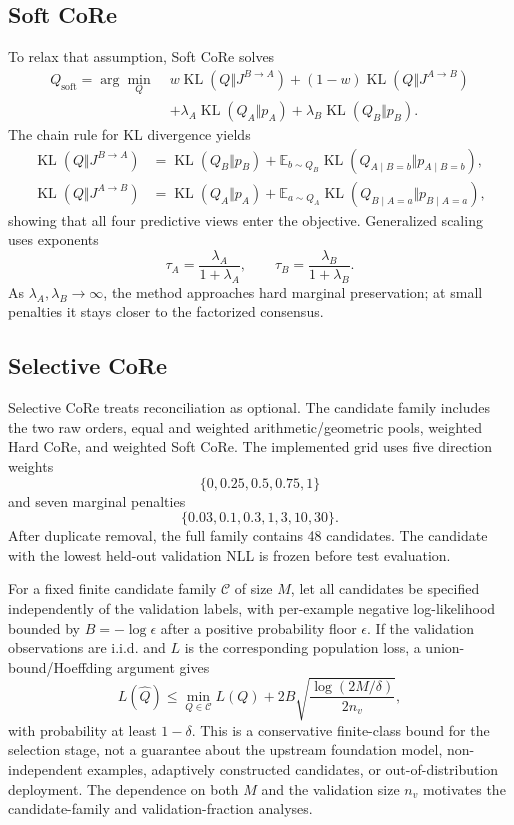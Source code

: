 \documentclass[a4paper,fleqn]{cas-sc}
\newcommand{\KL}{\operatorname{KL}}
\newcommand{\E}{\mathbb{E}}
\newcommand{\Jone}{J^{B\rightarrow A}}
\newcommand{\Jtwo}{J^{A\rightarrow B}}
\newcommand{\Qsoft}{Q_{\mathrm{soft}}}
\newcommand{\Cset}{\mathcal{C}}
\begin{document}
\subsection{Soft CoRe}
To relax that assumption, Soft CoRe solves
\begin{align}
\Qsoft=\arg\min_Q\;&w\KL(Q\Vert\Jone)+(1-w)\KL(Q\Vert\Jtwo)\nonumber\\
&+\lambda_A\KL(Q_A\Vert p_A)+\lambda_B\KL(Q_B\Vert p_B).
\end{align}
The chain rule for KL divergence yields
\begin{align}
\KL(Q\Vert\Jone)&=\KL(Q_B\Vert p_B)+\E_{b\sim Q_B}\KL(Q_{A\mid B=b}\Vert p_{A\mid B=b}),\\
\KL(Q\Vert\Jtwo)&=\KL(Q_A\Vert p_A)+\E_{a\sim Q_A}\KL(Q_{B\mid A=a}\Vert p_{B\mid A=a}),
\end{align}
showing that all four predictive views enter the objective. Generalized scaling uses exponents
\begin{equation}
\tau_A=\frac{\lambda_A}{1+\lambda_A},\qquad
\tau_B=\frac{\lambda_B}{1+\lambda_B}.
\end{equation}
As $\lambda_A,\lambda_B\rightarrow\infty$, the method approaches hard marginal preservation; at small penalties it stays closer to the factorized consensus.

\subsection{Selective CoRe}
Selective CoRe treats reconciliation as optional. The candidate family includes the two raw orders, equal and weighted arithmetic/geometric pools, weighted Hard CoRe, and weighted Soft CoRe. The implemented grid uses five direction weights
\begin{equation}
\{0,0.25,0.5,0.75,1\}
\end{equation}
and seven marginal penalties
\begin{equation}
\{0.03,0.1,0.3,1,3,10,30\}.
\end{equation}
After duplicate removal, the full family contains 48 candidates. The candidate with the lowest held-out validation NLL is frozen before test evaluation.

For a fixed finite candidate family $\Cset$ of size $M$, let all candidates be specified independently of the validation labels, with per-example negative log-likelihood bounded by $B=-\log\epsilon$ after a positive probability floor $\epsilon$. If the validation observations are i.i.d. and $L$ is the corresponding population loss, a union-bound/Hoeffding argument gives
\begin{equation}
L(\hat Q)\le\min_{Q\in\Cset}L(Q)+2B\sqrt{\frac{\log(2M/\delta)}{2n_v}},
\end{equation}
with probability at least $1-\delta$. This is a conservative finite-class bound for the selection stage, not a guarantee about the upstream foundation model, non-independent examples, adaptively constructed candidates, or out-of-distribution deployment. The dependence on both $M$ and the validation size $n_v$ motivates the candidate-family and validation-fraction analyses.
\end{document}
